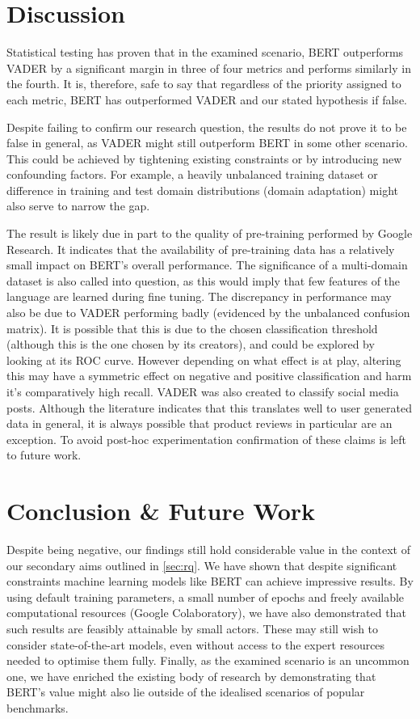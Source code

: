 \documentclass{csfourzero}
\begin{document}
\section{Discussion}
\label{sec:discuss}

Statistical testing has proven that in the examined scenario, BERT outperforms VADER by a significant margin in three of four metrics and performs similarly in the fourth. It is, therefore, safe to say that regardless of the priority assigned to each metric, BERT has outperformed VADER and our stated hypothesis if false.
\par
Despite failing to confirm our research question, the results do not prove it to be false in general, as VADER might still outperform BERT in some other scenario. This could be achieved by tightening existing constraints or by introducing new confounding factors. For example, a heavily unbalanced training dataset or difference in training and test domain distributions (domain adaptation) might also serve to narrow the gap.
\par
The result is likely due in part to the quality of pre-training performed by Google Research. It indicates that the availability of pre-training data has a relatively small impact on BERT's overall performance. The significance of a multi-domain dataset is also called into question, as this would imply that few features of the language are learned during fine tuning. The discrepancy in performance may also be due to VADER performing badly (evidenced by the unbalanced confusion matrix). It is possible that this is due to the chosen classification threshold (although this is the one chosen by its creators), and could be explored by looking at its ROC curve. However depending on what effect is at play, altering this may have a symmetric effect on negative and positive classification and harm it's comparatively high recall. VADER was also created to classify social media posts. Although the literature indicates that this translates well to user generated data in general, it is always possible that product reviews in particular are an exception. To avoid post-hoc experimentation confirmation of these claims is left to future work.

\section{Conclusion \& Future Work}
\label{sec:conc}

Despite being negative, our findings still hold considerable value in the context of our secondary aims outlined in \ref{sec:rq}. We have shown that despite significant constraints machine learning models like BERT can achieve impressive results. By using default training parameters, a small number of epochs and freely available computational resources (Google Colaboratory), we have also demonstrated that such results are feasibly attainable by small actors. These may still wish to consider state-of-the-art models, even without access to the expert resources needed to optimise them fully. Finally, as the examined scenario is an uncommon one, we have enriched the existing body of research by demonstrating that BERT's value might also lie outside of the idealised scenarios of popular benchmarks. 
\end{document}
